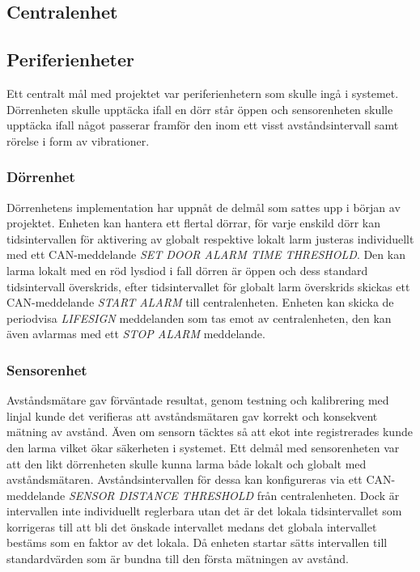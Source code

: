 \documentclass{article}
\begin{document}
\subsection{Centralenhet}

\subsection{Periferienheter}
Ett centralt mål med projektet var periferienhetern som skulle ingå i systemet. Dörrenheten skulle upptäcka ifall en dörr står öppen och sensorenheten skulle upptäcka ifall något passerar framför den inom ett visst avståndsintervall samt rörelse i form av vibrationer.

\subsubsection{Dörrenhet}
Dörrenhetens implementation har uppnåt de delmål som sattes upp i början av projektet. Enheten kan hantera ett flertal dörrar, för varje enskild dörr kan tidsintervallen för aktivering av globalt respektive lokalt larm justeras individuellt med ett CAN-meddelande \emph{SET DOOR ALARM TIME THRESHOLD}. Den kan larma lokalt med en röd lysdiod i fall dörren är öppen och dess standard tidsintervall överskrids, efter tidsintervallet för globalt larm överskrids skickas ett CAN-meddelande \emph{START ALARM} till centralenheten. Enheten kan skicka de periodvisa \emph{LIFESIGN} meddelanden som tas emot av centralenheten, den kan även avlarmas med ett \emph{STOP ALARM} meddelande.

\subsubsection{Sensorenhet}
Avståndsmätare gav förväntade resultat, genom testning och kalibrering med linjal kunde det verifieras att avståndsmätaren gav korrekt och konsekvent mätning av avstånd. Även om sensorn täcktes så att ekot inte registrerades kunde den larma vilket ökar säkerheten i systemet. Ett delmål med sensorenheten var att den likt dörrenheten skulle kunna larma både lokalt och globalt med avståndsmätaren. Avståndsintervallen för dessa kan konfigureras via ett CAN-meddelande \emph{SENSOR DISTANCE THRESHOLD} från centralenheten. Dock är intervallen inte individuellt reglerbara utan det är det lokala tidsintervallet som korrigeras till att bli det önskade intervallet medans det globala intervallet bestäms som en faktor av det lokala. Då enheten startar sätts intervallen till standardvärden som är bundna till den första mätningen av avstånd.
\\
\\
\end{document}
